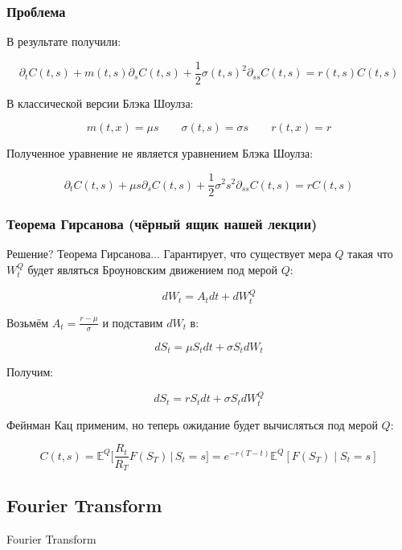 \documentclass{beamer}
\begin{document}
\begin{frame}
\frametitle{Проблема}

В результате получили:

\[ \partial_t C(t, s) + m(t, s) \partial_s C(t, s) + \frac{1}{2} \sigma(t, s)^2 \partial_{ss} C(t, s) = r(t, s) C(t, s) \]

В классической версии Блэка Шоулза:

\[
m(t, x) = \mu s \quad \quad \sigma(t, s) = \sigma s \quad \quad r(t, x) = r
\]

Полученное уравнение не является уравнением Блэка Шоулза:

\[ \partial_t C(t, s) + \mu s \partial_s C(t, s) + \frac{1}{2} \sigma^2 s^2 \partial_{ss} C(t, s) = r C(t, s) \]



\end{frame}

\begin{frame}
\frametitle{Теорема Гирсанова (чёрный ящик нашей лекции)}

Решение? Теорема Гирсанова... Гарантирует, что существует мера $Q$ такая что $W_t^Q$ будет являться Броуновским движением под мерой $Q$:

\[d W_t = A_t dt + d W_t^Q\]

Возьмём $A_t = \frac{r - \mu}{\sigma}$ и подставим $d W_t$ в:

\[ dS_t = \mu S_t dt + \sigma S_t dW_t \]

Получим:

\[ dS_t = r S_t dt + \sigma S_t dW_t^Q \]

Фейнман Кац применим, но теперь ожидание будет вычисляться под мерой $Q$:

\[ C(t, s) = \mathbb{E}^Q\bigg[\frac{R_t}{R_T} F(S_T)\, \bigg|\, S_t = s\bigg] = e^{-r(T-t)} \mathbb{E}^Q[F(S_T) \mid S_t = s] \]


\end{frame}

\subsection{Fourier Transform}

\begin{frame}

Fourier Transform


\end{frame}
\end{document}
